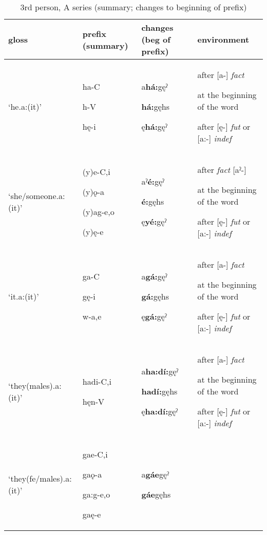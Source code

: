 \begin{table}
\caption{3rd person, A series (summary; changes to beginning of prefix)}
\label{tab:1:3apron}
\tiny{
\begin{tabularx}{\textwidth}{XXXX}
\lsptoprule
gloss & prefix (summary) & changes (beg of prefix) & environment\\
\midrule
‘he.a:(it)’ & ha-C

h-V

hę-i & a\textbf{há:}gęˀ

\textbf{há:}gęhs

ę\textbf{há:}gęˀ & after [a-] \textit{fact}

at the beginning of the word 

after [ę-] \textit{fut} or [a:-] \textit{indef}\\
‘she/someone.a:(it)’ & (y)e-C,i

(y)ǫ-a

(y)ag-e,o

(y)ę-e & aˀ\textbf{é:}gęˀ

\textbf{é:}gęhs

ę\textbf{yé:}gęˀ & after \textit{fact} [aˀ-] 

at the beginning of the word 

after [ę-] \textit{fut} or [a:-] \textit{indef}\\
‘it.a:(it)’ & ga-C

gę-i

w-a,e & a\textbf{gá:}gęˀ

\textbf{gá:}gęhs

ę\textbf{gá:}gęˀ & after [a-] \textit{fact}

at the beginning of the word 

after [ę-] \textit{fut} or [a:-] \textit{indef}\\
‘they(males).a:(it)’ & hadi-C,i

hęn-V & a\textbf{ha:dí:}gęˀ

\textbf{hadí:}gęhs

ę\textbf{ha:dí:}gęˀ & after [a-] \textit{fact}

at the beginning of the word 

after [ę-] \textit{fut} or [a:-] \textit{indef}\\
‘they(fe/males).a:(it)’ & gae-C,i

gaǫ-a

ga:g-e,o

gaę-e & a\textbf{gáe}gęˀ

\textbf{gáe}gęhs


\end{tabularx}}
\end{table}
